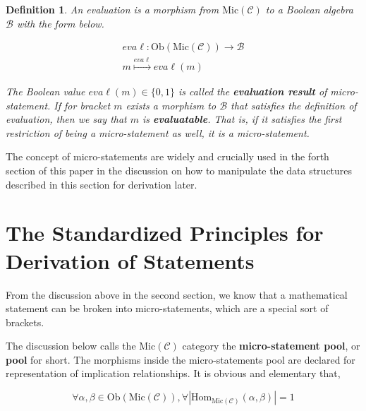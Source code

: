 \documentclass{aims}
\newtheorem{definition}{Definition}	%
\numberwithin{theorem}{section}	%
\numberwithin{axiom}{section}	%
\numberwithin{definition}{section}	%
\begin{document}
\begin{definition}
	An evaluation is a morphism from \(\text{Mic}(\mathcal{C})\) to a Boolean algebra \(\mathcal{B}\) with the form below.
	
	\begin{equation}
		\begin{gathered}
			\mathit{e}\mathit{v}\mathit{a}\ell :\text{Ob}(\text{Mic}(\mathcal{C}))\to \mathcal{B}\\
			\mathit{m}\overset{\mathit{e}\mathit{v}\mathit{a}\ell }{\mapsto }\mathit{e}\mathit{v}\mathit{a}\ell (\mathit{m})
		\end{gathered}
	\end{equation}
	
	The Boolean value \(\mathit{e}\mathit{v}\mathit{a}\ell (\mathit{m})\in \{0,1\}\) is called the \textbf{ evaluation result} of micro-statement. If for bracket \(\mathit{m}\) exists a morphism to \(\mathcal{B}\) that satisfies the definition of evaluation, then we say that \(\mathit{m}\) is \textbf{ evaluatable}. That is, if it satisfies the first restriction of being a micro-statement as well, it is a micro-statement.
\end{definition}

The concept of micro-statements are widely and crucially used in the forth section of this paper in the discussion on how to manipulate the data structures described in this section for derivation later.

\section{The Standardized Principles for Derivation of Statements}

From the discussion above in the second section, we know that a mathematical statement can be broken into micro-statements, which are a special sort of brackets.

The discussion below calls the \(\text{Mic}(\mathcal{C})\) category the \textbf{ micro-statement pool}, or \textbf{ pool} for short. The morphisms inside the micro-statements pool are declared for representation of implication relationships. It is obvious and elementary that,

\begin{equation}
	\forall \alpha ,\beta \in \text{Ob}(\text{Mic}(\mathcal{C})), \forall \left|\text{Hom}_{\text{Mic}(\mathcal{C})}(\alpha ,\beta )\right|=1
\end{equation}
\end{document}
